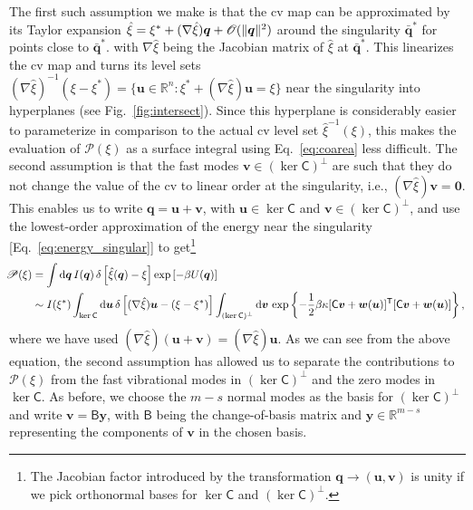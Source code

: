 The first such assumption we make is that the \ac{cv} map can be approximated by its Taylor expansion $\hat{\xi} = \xi^{*} + (\nabla\hat{\xi})\bm{q} + \mathscr{O}(\lVert\bm{q}\rVert^2)$ around the singularity $\bar{\bm{q}}^{*}$ for points close to $\bar{\bm{q}}^{*}$.
with $\nabla\hat{\xi}$ being the Jacobian matrix of $\hat{\xi}$ at $\bar{\bm{q}}^{*}$.
This linearizes the \ac{cv} map and turns its level sets $(\nabla\hat{\xi})^{-1}(\xi - \xi^{*}) = \{\bm{u} \in \mathbb{R}^{n}: \xi^{*} + (\nabla\hat{\xi})\bm{u} = \xi\}$ near the singularity into hyperplanes (see Fig.~\ref{fig:intersect}).
Since this hyperplane is considerably easier to parameterize in comparison to the actual \ac{cv} level set $\hat{\xi}^{-1}(\xi)$, this makes the evaluation of $\mathscr{P}(\xi)$ as a surface integral using Eq.~\eqref{eq:coarea} less difficult.
The second assumption is that the fast modes $\bm{v} \in (\ker\mathsf{C})^{\perp}$ are such that they do not change the value of the \ac{cv} to linear order at the singularity, i.e., $(\nabla\hat{\xi})\bm{v} = \bm{0}$.
This enables us to write $\bm{q} = \bm{u} + \bm{v}$, with $\bm{u} \in \ker\mathsf{C}$ and $\bm{v} \in (\ker\mathsf{C})^\perp$, and use the lowest-order approximation of the energy near the singularity [Eq.~\eqref{eq:energy_singular}] to get\footnote{The Jacobian factor introduced by the transformation $\bm{q} \to (\bm{u}, \bm{v})$ is unity if we pick orthonormal bases for $\ker\mathsf{C}$ and $(\ker\mathsf{C})^{\perp}$.}
%
\begin{equation}
  \hspace{-0.5em}
  \begin{aligned}
    \mathscr{P}(\xi) &= \int \mathrm{d}\bm{q}\, I(\bm{q})\,\delta\left[\hat{\xi}(\bm{q}) - \xi\right] \exp\left[-\beta U(\bm{q})\right]\\
                                 &\sim I(\xi^{*}) \int_{\ker\mathsf{C}} \mathrm{d}\bm{u}\, \delta\left[(\nabla\hat{\xi})\bm{u} - (\xi - \xi^{*})\right] \int_{(\ker\mathsf{C})^{\perp}} \mathrm{d}\bm{v}\,  \exp\left\{-\frac{1}{2}\beta\kappa[\mathsf{C}\bm{v} + \bm{w}(\bm{u})]^\mathsf{T}[\mathsf{C}\bm{v} + \bm{w}(\bm{u})]\right\},
  \end{aligned}
\end{equation}
%
where we have used $(\nabla\hat{\xi})(\bm{u} + \bm{v}) = (\nabla\hat{\xi})\bm{u}$.
As we can see from the above equation, the second assumption has allowed us to separate the contributions to $\mathscr{P}(\xi)$ from the fast vibrational modes in $(\ker\mathsf{C})^{\perp}$ and the zero modes in $\ker\mathsf{C}$.
As before, we choose the $m - s$ normal modes as the basis for $(\ker\mathsf{C})^{\perp}$ and write $\bm{v} = \mathsf{B}\bm{y}$, with $\mathsf{B}$ being the change-of-basis matrix and $\bm{y} \in \mathbb{R}^{m-s}$ representing the components of $\bm{v}$ in the chosen basis.
